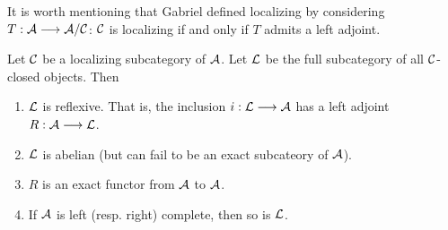 \begin{rmk}
It is worth mentioning that Gabriel defined localizing by 
considering $T: \mathcal{A} \longrightarrow \mathcal{A}/\mathcal{C}$: $\mathcal{C}$ is 
localizing if and only if $T$ admits a left adjoint.
\end{rmk}

\begin{thm}
Let $\mathcal{C}$ be a localizing subcategory of $\mathcal{A}$. Let
$\mathcal{L}$ be the full subcategory of all $\mathcal{C}$-closed objects.
Then
\begin{enumerate}
\item $\mathcal{L}$ is reflexive. That is, the inclusion $i: \mathcal{L}
\longrightarrow \mathcal{A}$ has a left adjoint $R: \mathcal{A} \longrightarrow \mathcal{L}$.

\item $\mathcal{L}$ is abelian (but can fail to be an exact subcateory
of $\mathcal{A}$).

\item $R$ is an exact functor from $\mathcal{A}$ to $\mathcal{A}$.

\item If $\mathcal{A}$ is left (resp. right) complete, then so is
$\mathcal{L}$.

\end{enumerate}
\end{thm}
